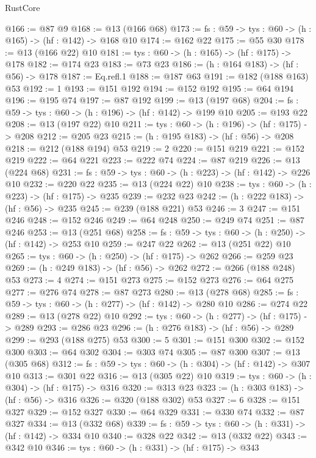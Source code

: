 \begin{lexlean}{RustCore}
\begin{coremodule}
@166 := @87 @9
@168 := @13 (@166 @68)
@173 := {fs : @59} -> {tys : @60} -> (h : @165) -> (hf : @142) -> @168 @10
@174 := @162 @22
@175 := @55 @30
@178 := @13 (@166 @22) @10
@181 := {tys : @60} -> (h : @165) -> (hf : @175) -> @178
@182 := @174 @23
@183 := @73 @23
@186 := (h : @164 @183) -> (hf : @56) -> @178
@187 := Eq.refl.{1}
@188 := @187 @63
@191 := @182 (@188 @163) @53
@192 := 1
@193 := @151 @192
@194 := @152 @192
@195 := @64 @194
@196 := @195 @74
@197 := @87 @192
@199 := @13 (@197 @68)
@204 := {fs : @59} -> {tys : @60} -> (h : @196) -> (hf : @142) -> @199 @10
@205 := @193 @22
@208 := @13 (@197 @22) @10
@211 := {tys : @60} -> (h : @196) -> (hf : @175) -> @208
@212 := @205 @23
@215 := (h : @195 @183) -> (hf : @56) -> @208
@218 := @212 (@188 @194) @53
@219 := 2
@220 := @151 @219
@221 := @152 @219
@222 := @64 @221
@223 := @222 @74
@224 := @87 @219
@226 := @13 (@224 @68)
@231 := {fs : @59} -> {tys : @60} -> (h : @223) -> (hf : @142) -> @226 @10
@232 := @220 @22
@235 := @13 (@224 @22) @10
@238 := {tys : @60} -> (h : @223) -> (hf : @175) -> @235
@239 := @232 @23
@242 := (h : @222 @183) -> (hf : @56) -> @235
@245 := @239 (@188 @221) @53
@246 := 3
@247 := @151 @246
@248 := @152 @246
@249 := @64 @248
@250 := @249 @74
@251 := @87 @246
@253 := @13 (@251 @68)
@258 := {fs : @59} -> {tys : @60} -> (h : @250) -> (hf : @142) -> @253 @10
@259 := @247 @22
@262 := @13 (@251 @22) @10
@265 := {tys : @60} -> (h : @250) -> (hf : @175) -> @262
@266 := @259 @23
@269 := (h : @249 @183) -> (hf : @56) -> @262
@272 := @266 (@188 @248) @53
@273 := 4
@274 := @151 @273
@275 := @152 @273
@276 := @64 @275
@277 := @276 @74
@278 := @87 @273
@280 := @13 (@278 @68)
@285 := {fs : @59} -> {tys : @60} -> (h : @277) -> (hf : @142) -> @280 @10
@286 := @274 @22
@289 := @13 (@278 @22) @10
@292 := {tys : @60} -> (h : @277) -> (hf : @175) -> @289
@293 := @286 @23
@296 := (h : @276 @183) -> (hf : @56) -> @289
@299 := @293 (@188 @275) @53
@300 := 5
@301 := @151 @300
@302 := @152 @300
@303 := @64 @302
@304 := @303 @74
@305 := @87 @300
@307 := @13 (@305 @68)
@312 := {fs : @59} -> {tys : @60} -> (h : @304) -> (hf : @142) -> @307 @10
@313 := @301 @22
@316 := @13 (@305 @22) @10
@319 := {tys : @60} -> (h : @304) -> (hf : @175) -> @316
@320 := @313 @23
@323 := (h : @303 @183) -> (hf : @56) -> @316
@326 := @320 (@188 @302) @53
@327 := 6
@328 := @151 @327
@329 := @152 @327
@330 := @64 @329
@331 := @330 @74
@332 := @87 @327
@334 := @13 (@332 @68)
@339 := {fs : @59} -> {tys : @60} -> (h : @331) -> (hf : @142) -> @334 @10
@340 := @328 @22
@342 := @13 (@332 @22)
@343 := @342 @10
@346 := {tys : @60} -> (h : @331) -> (hf : @175) -> @343

\end{coremodule}
\end{lexlean}
